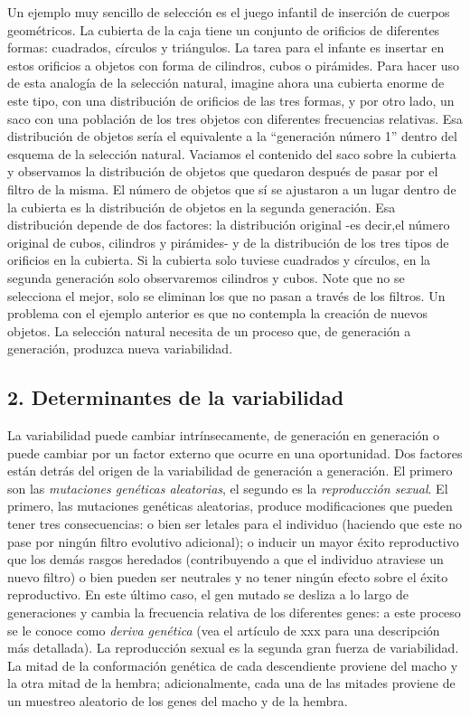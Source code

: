 \documentclass[
  letterpaper,
]{book}
\begin{document}
Un ejemplo muy sencillo de selección es el juego infantil de inserción
de cuerpos geométricos. La cubierta de la caja tiene un conjunto de
orificios de diferentes formas: cuadrados, círculos y triángulos. La
tarea para el infante es insertar en estos orificios a objetos con forma
de cilindros, cubos o pirámides. Para hacer uso de esta analogía de la
selección natural, imagine ahora una cubierta enorme de este tipo, con
una distribución de orificios de las tres formas, y por otro lado, un
saco con una población de los tres objetos con diferentes frecuencias
relativas. Esa distribución de objetos sería el equivalente a la
``generación número 1'' dentro del esquema de la selección natural.
Vaciamos el contenido del saco sobre la cubierta y observamos la
distribución de objetos que quedaron después de pasar por el filtro de
la misma. El número de objetos que sí se ajustaron a un lugar dentro de
la cubierta es la distribución de objetos en la segunda generación. Esa
distribución depende de dos factores: la distribución original -es
decir,el número original de cubos, cilindros y pirámides- y de la
distribución de los tres tipos de orificios en la cubierta. Si la
cubierta solo tuviese cuadrados y círculos, en la segunda generación
solo observaremos cilindros y cubos. Note que no se selecciona el mejor,
solo se eliminan los que no pasan a través de los filtros. Un problema
con el ejemplo anterior es que no contempla la creación de nuevos
objetos. La selección natural necesita de un proceso que, de generación
a generación, produzca nueva variabilidad.

\subsection{2. Determinantes de la
variabilidad}\label{determinantes-de-la-variabilidad}

La variabilidad puede cambiar intrínsecamente, de generación en
generación o puede cambiar por un factor externo que ocurre en una
oportunidad. Dos factores están detrás del origen de la variabilidad de
generación a generación. El primero son las \emph{mutaciones genéticas
aleatorias}, el segundo es la \emph{reproducción sexual}. El primero,
las mutaciones genéticas aleatorias, produce modificaciones que pueden
tener tres consecuencias: o bien ser letales para el individuo (haciendo
que este no pase por ningún filtro evolutivo adicional); o inducir un
mayor éxito reproductivo que los demás rasgos heredados (contribuyendo a
que el individuo atraviese un nuevo filtro) o bien pueden ser neutrales
y no tener ningún efecto sobre el éxito reproductivo. En este último
caso, el gen mutado se desliza a lo largo de generaciones y cambia la
frecuencia relativa de los diferentes genes: a este proceso se le conoce
como \emph{deriva genética} (vea el artículo de xxx para una descripción
más detallada). La reproducción sexual es la segunda gran fuerza de
variabilidad. La mitad de la conformación genética de cada descendiente
proviene del macho y la otra mitad de la hembra; adicionalmente, cada
una de las mitades proviene de un muestreo aleatorio de los genes del
macho y de la hembra.
\end{document}
